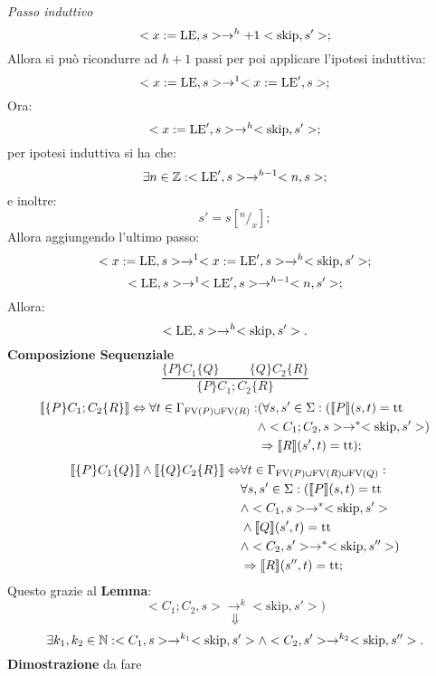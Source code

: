 \documentclass[a4paper, 12pt, oneside,fleqn]{book}
\begin{document}
\textit{Passo induttivo}\\
$$<x:=\mathrm{LE},s>\rightarrow ^h+1<\mathrm{skip},s'>;$$
Allora si può ricondurre ad $h+1$ passi per poi applicare l'ipotesi induttiva:
$$<x:=\mathrm{LE},s>\rightarrow ^1<x:=\mathrm{LE}',s>;$$
Ora:
$$<x:=\mathrm{LE}',s>\rightarrow ^h<\mathrm{skip},s'>;$$
per ipotesi induttiva si ha che:
$$\exists n \in \mathbb{Z}\mathrel{:} <\mathrm{LE}',s>\rightarrow ^{h-1}<n,s>;$$
e inoltre:
$$s'=s[^n/_x];$$
Allora aggiungendo l'ultimo passo:
$$<x:=\mathrm{LE},s>\rightarrow ^1<x:=\mathrm{LE}',s>\rightarrow ^h<\mathrm{skip},s'>;$$
$$<\mathrm{LE},s>\rightarrow ^1<\mathrm{LE}',s>\rightarrow ^{h-1}<n,s'>;$$
Allora:
$$<\mathrm{LE},s>\rightarrow ^h<\mathrm{skip},s'>.$$
\textbf{Composizione Sequenziale}
$$\frac{\{P\} C_1\{Q\} \hspace{1cm} \{Q\} C_2\{R\}}{\{P\} C_1; C_2\{R\}}$$
\begin{align*}
\llbracket \{P\} C_1; C_2\{R\} \rrbracket \Leftrightarrow \forall t \in \Gamma_{\mathrm{FV}(P)\cup\mathrm{FV}(R)}\mathrel{:}
&(\forall s,s'\in \Sigma \mathrel{:}(\llbracket P \rrbracket(s,t) = \mathrm{tt} \\
&\wedge <C_1;C_2,s>\rightarrow ^*<\mathrm{skip},s'>)\\
&\Rightarrow\llbracket R \rrbracket(s',t)=\mathrm{tt});
\end{align*}
\begin{align*}
\llbracket \{P\}C_1\{Q\} \rrbracket \wedge \llbracket \{Q\}C_2\{R\} \rrbracket \Leftrightarrow
&\forall t \in \Gamma_{\mathrm{FV}(P)\cup\mathrm{FV}(R)\cup\mathrm{FV}(Q)}\mathrel{:}\\
&\forall s,s'\in \Sigma \mathrel{:}(\llbracket P \rrbracket(s,t) = \mathrm{tt}\\
&\wedge <C_1,s>\rightarrow ^*<\mathrm{skip},s'>\\
&\wedge \llbracket Q\rrbracket(s',t)=\mathrm{tt} \\
&\wedge <C_2,s'>\rightarrow ^*<\mathrm{skip},s''>)\\
&\Rightarrow\llbracket R\rrbracket(s'',t)=\mathrm{tt};
\end{align*}
Questo grazie al \textbf{Lemma}:
$$<C_1;C_2,s>\rightarrow ^k<\mathrm{skip},s'>)$$
$$\Downarrow$$
$$\exists k_1,k_2 \in\mathbb{N}\mathrel{:}<C_1,s>\rightarrow ^{k_1}<\mathrm{skip},s'> \wedge <C_2,s'>\rightarrow ^{k_2}<\mathrm{skip},s''>.$$
\textbf{Dimostrazione} da fare
\end{document}
